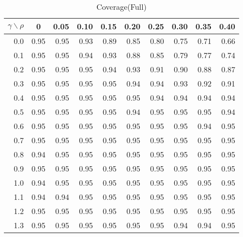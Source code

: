 \documentclass[12pt]{article}
\begin{document}
%
\begin{table}[!tbp]
\caption{Coverage(Full)}
 \begin{center}
 \begin{tabular}{r|rrrrrrrrr}\hline\hline
\multicolumn{1}{c|}{$\gamma\backslash\rho$}&\multicolumn{1}{c}{0}&\multicolumn{1}{c}{0.05}&\multicolumn{1}{c}{0.10}&\multicolumn{1}{c}{0.15}&\multicolumn{1}{c}{0.20}&\multicolumn{1}{c}{0.25}&\multicolumn{1}{c}{0.30}&\multicolumn{1}{c}{0.35}&\multicolumn{1}{c}{0.40}\tabularnewline
\hline

0.0&0.95&0.95&0.93&0.89&0.85&0.80&0.75&0.71&0.66\tabularnewline
0.1&0.95&0.95&0.94&0.93&0.88&0.85&0.79&0.77&0.74\tabularnewline
0.2&0.95&0.95&0.95&0.94&0.93&0.91&0.90&0.88&0.87\tabularnewline
0.3&0.95&0.95&0.95&0.95&0.94&0.94&0.93&0.92&0.91\tabularnewline
0.4&0.95&0.95&0.95&0.95&0.95&0.94&0.94&0.94&0.94\tabularnewline
0.5&0.95&0.95&0.95&0.95&0.94&0.95&0.95&0.95&0.94\tabularnewline
0.6&0.95&0.95&0.95&0.95&0.95&0.95&0.95&0.94&0.95\tabularnewline
0.7&0.95&0.95&0.95&0.95&0.95&0.95&0.95&0.95&0.95\tabularnewline
0.8&0.94&0.95&0.95&0.95&0.95&0.95&0.95&0.95&0.95\tabularnewline
0.9&0.95&0.95&0.95&0.95&0.95&0.95&0.95&0.95&0.95\tabularnewline
1.0&0.94&0.95&0.95&0.95&0.95&0.95&0.95&0.95&0.95\tabularnewline
1.1&0.94&0.94&0.95&0.95&0.95&0.95&0.95&0.95&0.95\tabularnewline
1.2&0.95&0.95&0.95&0.95&0.95&0.95&0.95&0.95&0.95\tabularnewline
1.3&0.95&0.95&0.95&0.95&0.95&0.95&0.94&0.94&0.95\tabularnewline
\hline
\end{tabular}

\end{center}

\end{table}
\end{document}
